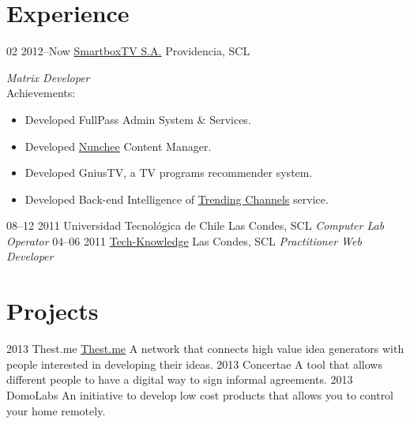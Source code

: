 \documentclass[]{friggeri-cv}
\begin{document}
\section{Experience}

\begin{entrylist}
  \entry
    {02 2012--Now}
    {\href{http://www.smartboxtv.com}{SmartboxTV S.A.}}
    {Providencia, SCL}
    {\emph{Matrix Developer} \\
      Achievements:
      \begin{itemize}
        \item Developed FullPass Admin System \& Services.
        \item Developed {\href{http://www.nunchee.tv}{Nunchee}} Content Manager.
        \item Developed GniusTV, a TV programs recommender system.
        \item Developed Back-end Intelligence of {\href{http://www.smartboxtv.com/products/twitv/}{Trending Channels}} service.
      \end{itemize}}
  \entry
    {08--12 2011}
    {Universidad Tecnológica de Chile}
    {Las Condes, SCL}
    {\emph{Computer Lab Operator}}
  \entry
    {04--06 2011}
    {\href{http://www.techk.cl/}{Tech-Knowledge}}
    {Las Condes, SCL}
    {\emph{Practitioner Web Developer}}
\end{entrylist}

\section{Projects}

\begin{entrylist}
  \entry
    {2013}
    {Thest.me}
    {\href{http://thest.me}{Thest.me}}
    {A network that connects high value idea generators with people interested in developing their ideas.}
  \entry
    {2013}
    {Concertae}
    { }
    {A tool that allows different people to have a digital way to sign informal agreements.}
  \entry
    {2013}
    {DomoLabs}
    { }
    {An initiative to develop low cost products that allows you to control your home remotely.}
\end{entrylist}


% 
\end{document}
